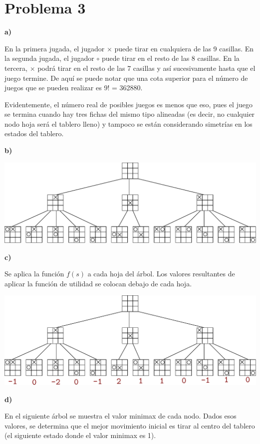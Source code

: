 \documentclass{article}
\begin{document}
\section*{Problema 3}

\textbf{a)}

En la primera jugada, el jugador $\times$ puede tirar en cualquiera de las 9 casillas. En la segunda jugada, el jugador $\circ$ puede tirar en el resto de las 8 casillas. En la tercera, $\times$ podrá tirar en el resto de las 7 casillas y así sucesivamente hasta que el juego termine. De aquí se puede notar que una cota superior para el número de juegos que se pueden realizar es 9! = 362880.

Evidentemente, el número real de posibles juegos es menos que eso, pues el juego se termina cuando hay tres fichas del mismo tipo alineadas (es decir, no cualquier nodo hoja será el tablero lleno) y tampoco se están considerando simetrías en los estados del tablero.

\textbf{b)}

\includegraphics[scale=0.6]{gatos1}

\textbf{c)}

Se aplica la función $f(s)$ a cada hoja del árbol. Los valores resultantes de aplicar la función de utilidad se colocan debajo de cada hoja.

\includegraphics[scale=0.6]{gatos2}

\textbf{d)}

En el siguiente árbol se muestra el valor minimax de cada nodo. Dados esos valores, se determina que el mejor movimiento inicial es tirar al centro del tablero (el siguiente estado donde el valor minimax es 1).
\end{document}
